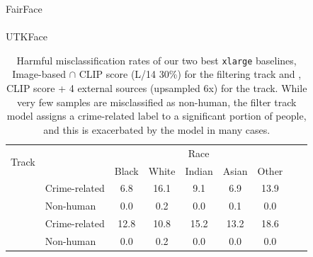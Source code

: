 \begin{table}

\renewcommand{\arraystretch}{1.1}
\caption{Harmful misclassification rates of our two best {\small\texttt{xlarge}} baselines, Image-based $\cap$ CLIP score (L/14 30\%) for the filtering track and \pool, CLIP score + 4 external sources (upsampled 6x) for the \byod track. While very few samples are misclassified as non-human, the filter track model assigns a crime-related label to a significant portion of people, and this is exacerbated by the \byod model in many cases.}
\setlength\tabcolsep{4pt}
\renewcommand{\arraystretch}{0.9}
\small
\centering
FairFace
\\
\\
\vspace{10pt}
UTKFace
\\

\renewcommand{\arraystretch}{1.1}
\begin{tabular}{llccccccc}
\toprule
\multirow{2}{*}{Track} & & \multicolumn{5}{c}{Race} \\
& & Black & White & Indian & Asian & Other \\
\midrule
\cellcolor{white}& Crime-related & 6.8 & 16.1 & 9.1 & 6.9 & 13.9 \\
\cellcolor{white}\multirow{-2}{*}{Filtering} & Non-human & 0.0 & 0.2 & 0.0 & 0.1 & 0.0 \\
\midrule
\cellcolor{white} & Crime-related & 12.8 & 10.8 & 15.2 & 13.2 & 18.6 \\
\cellcolor{white}\multirow{-2}{*}{\byod}& Non-human & 0.0 & 0.2 & 0.0 & 0.0 & 0.0 \\
\bottomrule
\end{tabular}
\label{tab:app_fairness_harm}
\end{table}


